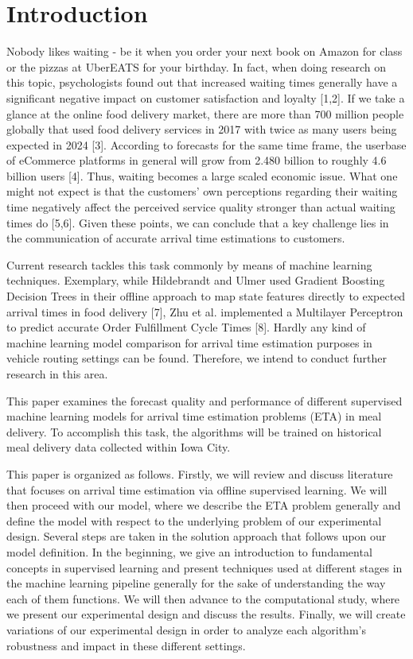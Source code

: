 \chapter{Introduction}

Nobody likes waiting - be it when you order your next book on Amazon for class or the pizzas at UberEATS for your birthday. In fact, when doing research on this topic, psychologists found out that increased waiting times generally have a significant negative impact on customer satisfaction and loyalty [1,2]. If we take a glance at the online food delivery market, there are more than 700 million people globally that used food delivery services in 2017 with twice as many users being expected in 2024 [3]. According to forecasts for the same time frame, the userbase of eCommerce platforms in general will grow from 2.480 billion to roughly 4.6 billion users [4]. Thus, waiting becomes a large scaled economic issue. What one might not expect is that the customers’ own perceptions regarding their waiting time negatively affect the perceived service quality stronger than actual waiting times do [5,6]. Given these points, we can conclude that a key challenge lies in the communication of accurate arrival time estimations to customers. 

Current research tackles this task commonly by means of machine learning techniques. Exemplary, while Hildebrandt and Ulmer used Gradient Boosting Decision Trees in their offline approach to map state features directly to expected arrival times in food delivery [7], Zhu et al. implemented a Multilayer Perceptron to predict accurate Order Fulfillment Cycle Times [8]. Hardly any kind of machine learning model comparison for arrival time estimation purposes in vehicle routing settings can be found. Therefore, we intend to conduct further research in this area.  

This paper examines the forecast quality and performance of different supervised machine learning models for arrival time estimation problems (ETA) in meal delivery. To accomplish this task, the algorithms will be trained on historical meal delivery data collected within Iowa City. 

This paper is organized as follows. Firstly, we will review and discuss literature that focuses on arrival time estimation via offline supervised learning. We will then proceed with our model, where we describe the ETA problem generally and define the model with respect to the underlying problem of our experimental design. Several steps are taken in the solution approach that follows upon our model definition. In the beginning, we give an introduction to fundamental concepts in supervised learning and present techniques used at different stages in the machine learning pipeline generally for the sake of understanding the way each of them functions. We will then advance to the computational study, where we present our experimental design and discuss the results. Finally, we will create variations of our experimental design in order to analyze each algorithm’s robustness and impact in these different settings.